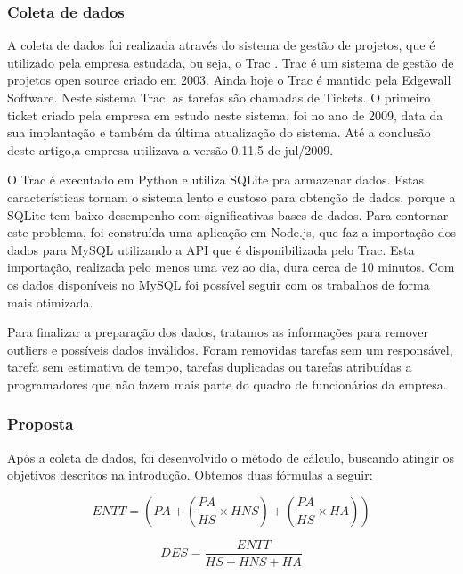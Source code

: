 \subsubsection{Coleta de dados}
A coleta de dados foi realizada através do sistema de gestão de projetos, que é utilizado pela empresa estudada, ou seja, o Trac \cite{TracProject}. Trac é um sistema de gestão de projetos open source criado em 2003. Ainda hoje o Trac é mantido pela Edgewall Software. Neste sistema Trac, as tarefas são chamadas de Tickets. O primeiro ticket criado pela empresa em estudo neste sistema, foi no ano de 2009, data da sua implantação e também da última atualização do sistema. Até a conclusão deste artigo,a empresa utilizava a versão 0.11.5 de jul/2009.\par
O Trac é executado em Python e utiliza SQLite pra armazenar dados. Estas características tornam o sistema lento e custoso para obtenção de dados, porque a SQLite tem baixo desempenho com significativas bases de dados. Para contornar este problema, foi construída uma aplicação em Node.js, que faz a importação dos dados para MySQL utilizando a API que é disponibilizada pelo Trac. Esta importação, realizada pelo menos uma vez ao dia, dura cerca de 10 minutos. Com os dados disponíveis no MySQL foi possível seguir com os trabalhos de forma mais otimizada. \par
Para finalizar a preparação dos dados, tratamos as informações para remover outliers e possíveis dados inválidos. Foram removidas tarefas sem um responsável, tarefa sem estimativa de tempo, tarefas duplicadas ou tarefas atribuídas a programadores que não fazem mais parte do quadro de funcionários da empresa.\par

\subsubsection{Proposta}

Após a coleta de dados, foi desenvolvido o método de cálculo, buscando atingir os objetivos descritos na introdução. Obtemos duas fórmulas a seguir:

\begin{equation} \label{nova_1}
    ENTT = (PA + (\frac{PA}{HS} \times HNS ) + ( \frac{PA}{HS} \times HA )) 
\end{equation}

\bigskip

\begin{equation} \label{nova_2}
    DES = \frac{ENTT}{HS + HNS + HA}
\end{equation}

